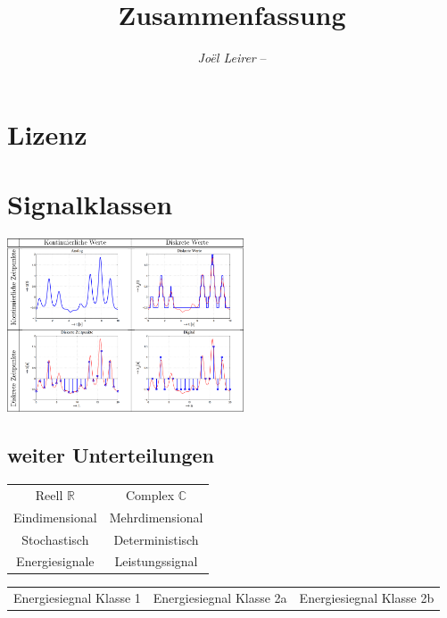 \documentclass[margin=normal]{tex/hsrzf}
\author{\textsl{Joël Leirer} -- \texttt{\theauthoremail}}
\title{\texttt{\themodule} Zusammenfassung}
\date{\thesemester}
\begin{document}

\maketitle



\section*{Lizenz}
\doclicenseThis
\clearpage
\tableofcontents

\clearpage
\setcounter{page}{1}

\section{Signalklassen}
\begin{multicols}{2}
  \includegraphics[width = 7cm]{img/Signalklassen.png}
  \subsection{weiter Unterteilungen}
    \begin{tabular}{|c|c|}
    Reell $\mathbb{R}$  &  Complex $\mathbb{C}$ \\
    Eindimensional & Mehrdimensional\\
    Stochastisch & Deterministisch \\
    Energiesignale & Leistungssignal \\
    \end{tabular}
\end{multicols}
\begin{tabular}{lll}
  Energiesiegnal Klasse 1 &
  Energiesiegnal Klasse 2a &
  Energiesiegnal Klasse 2b
\end{tabular}
 
\end{document}
